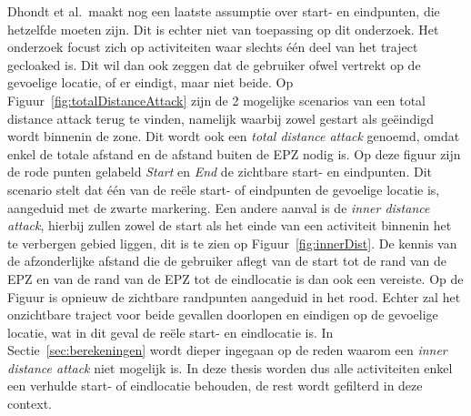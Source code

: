 Dhondt et al.\ maakt nog een laatste assumptie over start- en eindpunten, die
hetzelfde moeten zijn. Dit is echter niet van toepassing op dit onderzoek. Het
onderzoek focust zich op activiteiten waar slechts één deel van het traject
gecloaked is. Dit wil dan ook zeggen dat de gebruiker ofwel vertrekt op de
gevoelige locatie, of er eindigt, maar niet beide. Op
Figuur~\ref{fig:totalDistanceAttack} zijn de 2 mogelijke scenarios van een
total distance attack terug te vinden, namelijk waarbij zowel gestart als
geëindigd wordt binnenin de zone. Dit wordt ook een \textit{total distance
    attack} genoemd, omdat enkel de totale afstand en de afstand buiten de \ac{EPZ}
nodig is. Op deze figuur zijn de rode punten gelabeld \textit{Start} en
\textit{End} de zichtbare start- en eindpunten. Dit scenario stelt dat één van
de reële start- of eindpunten de gevoelige locatie is, aangeduid met de zwarte
markering. Een andere aanval is de \textit{inner distance attack}, hierbij
zullen zowel de start als het einde van een activiteit binnenin het te
verbergen gebied liggen, dit is te zien op Figuur~\ref{fig:innerDist}. De
kennis van de afzonderlijke afstand die de gebruiker aflegt van de start tot de
rand van de \ac{EPZ} en van de rand van de \ac{EPZ} tot de eindlocatie is dan
ook een vereiste. Op de Figuur is opnieuw de zichtbare randpunten aangeduid in
het rood. Echter zal het onzichtbare traject voor beide gevallen doorlopen en
eindigen op de gevoelige locatie, wat in dit geval de reële start- en
eindlocatie is. In Sectie~\ref{sec:berekeningen} wordt dieper ingegaan op de
reden waarom een \textit{inner distance attack} niet mogelijk is. In deze
thesis worden dus alle activiteiten enkel een verhulde start- of eindlocatie
behouden, de rest wordt gefilterd in deze context.

